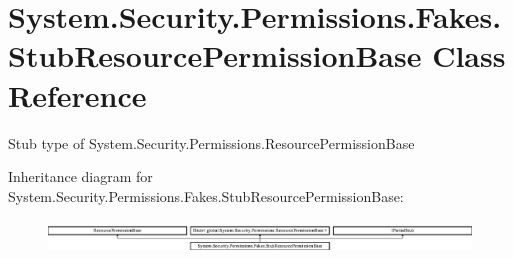 \hypertarget{class_system_1_1_security_1_1_permissions_1_1_fakes_1_1_stub_resource_permission_base}{\section{System.\-Security.\-Permissions.\-Fakes.\-Stub\-Resource\-Permission\-Base Class Reference}
\label{class_system_1_1_security_1_1_permissions_1_1_fakes_1_1_stub_resource_permission_base}
}


Stub type of System.\-Security.\-Permissions.\-Resource\-Permission\-Base 


Inheritance diagram for System.\-Security.\-Permissions.\-Fakes.\-Stub\-Resource\-Permission\-Base\-:\begin{figure}[H]
\begin{center}
\leavevmode
\includegraphics[height=0.891010cm]{class_system_1_1_security_1_1_permissions_1_1_fakes_1_1_stub_resource_permission_base}
\end{center}
\end{figure}
